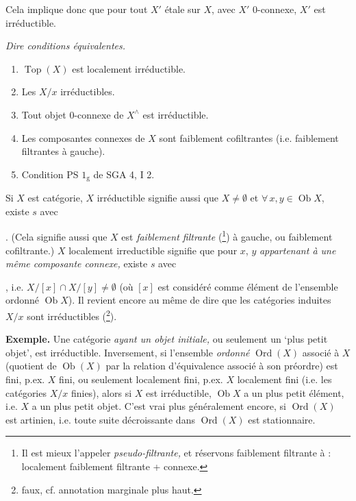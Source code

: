 \documentclass[11pt]{article}
\newcommand{\msp}[1]{\marginpar{\footnotesize [#1]}}
\begin{document}
Cela implique donc que pour tout $X'$ étale sur $X$, avec $X'$ 0-connexe, $X'$ est irréductible.

\textit{Dire conditions équivalentes.}
\begin{enumerate}
\item[a)] $\operatorname{Top}(X)$ est localement irréductible.
\item[b)] Les $X/x$ irréductibles.
\item[c)] Tout objet 0-connexe de $X^\wedge$ est irréductible.
\item[d)] Les composantes connexes de $X$ sont faiblement cofiltrantes (i.e. faiblement filtrantes à gauche).
\item[e)] Condition PS $1_{\mathrm{g}}$ de SGA 4, I 2.
\end{enumerate}
Si $X$ est catégorie, $X$ irréductible signifie aussi que $X \neq \emptyset$ et $\forall\, x, y \in \operatorname{Ob} X$, existe $s$ avec . (Cela signifie aussi que $X$ est \textit{faiblement filtrante} (\footnote[11]{Il est mieux l'appeler \textit{pseudo-filtrante,} et réservons faiblement filtrante à : localement faiblement filtrante + connexe.}) à gauche, ou faiblement cofiltrante.) $X$ localement irreductible signifie que pour $x$, $y$ \textit{appartenant à une même composante connexe,} existe $s$ avec , %
\msp{page 13}
i.e. $X/[x] \cap X/[y] \neq \emptyset$ (où $[x]$ est considéré comme élément de l'ensemble ordonné $\operatorname{Ob} X$). Il revient encore au même de dire que les catégories induites $X/x$ sont irréductibles (\footnote[12]{faux, cf. annotation marginale plus haut.}).

\textbf{Exemple.} Une catégorie \textit{ayant un objet initiale,} ou seulement un `plus petit objet', est irréductible. Inversement, si l'ensemble \textit{ordonné} $\operatorname{Ord}(X)$ associé à $X$ (quotient de $\operatorname{Ob}(X)$ par la relation d'équivalence associé à son préordre) est fini, p.ex. $X$ fini, ou seulement localement fini, p.ex. $X$ localement fini (i.e. les catégories $X/x$ finies), alors si $X$ est irréductible, $\operatorname{Ob} X$ a un plus petit élément, i.e. $X$ a un plus petit objet. C'est vrai plus généralement encore, si $\operatorname{Ord}(X)$ est artinien, i.e. toute suite décroissante dans $\operatorname{Ord}(X)$ est stationnaire. %
\end{document}
